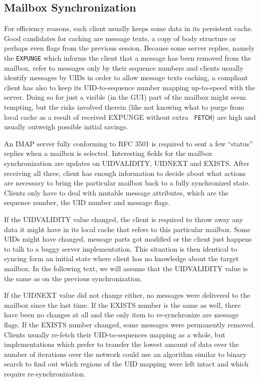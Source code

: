 \documentclass[12pt,notitlepage]{report}
\begin{document}
\subsection{Mailbox Synchronization}

For efficiency reasons, each client usually keeps some data in its persistent
cache.  Good candidates for caching are message texts, a copy of body structure or
perhaps even flags from the previous session.  Because some server replies, namely
the {\tt EXPUNGE} which informs the client that a message has been removed from
the mailbox, refer to messages only by their sequence numbers and clients
usually identify messages by UIDs in order to allow message texts caching, a
compliant client has also to keep its UID-to-sequence number mapping up-to-speed
with the server.  Doing so for just a visible (in the GUI) part of the mailbox
might seem tempting, but the risks involved therein (like not knowing what to
purge from local cache as a result of received EXPUNGE without extra {\tt
FETCH}) are high and usually outweigh possible initial savings.

An IMAP server fully conforming to RFC 3501 is required to sent a few ``status''
replies when a mailbox is selected.  Interesting fields for the mailbox
synchronization are updates on UIDVALIDITY, UIDNEXT and EXISTS.  After receiving
all three, client has enough information to decide about what actions are
necessary to bring the particular mailbox back to a fully synchronized state.
Clients only have to deal with mutable message attributes, which are the
sequence number, the UID number and message flags.

If the UIDVALIDITY value changed, the client is required to throw away any data it
might have in its local cache that refers to this particular mailbox.  Some UIDs
might have changed, message parts got modified or the client just happens to
talk to a buggy server implementation.  This situation is then identical to
syncing form an initial state where client has no knowledge about the target
mailbox. In the following text, we will assume that the UIDVALIDITY value is the
same as on the previous synchronization.

If the UIDNEXT value did not change either, no messages were delivered to the
mailbox since the last time.  If the EXISTS number is the same as well, there
have been no changes at all and the only item to re-synchronize are message
flags.  If the EXISTS number changed, some messages were permanently removed.
Clients usually re-fetch their UID-to-sequences mapping as a whole, but
implementations which prefer to transfer the lowest amount of data over the 
number of iterations over the network could use an algorithm similar
to binary search to find out which regions of the UID mapping were left intact
and which require re-synchronization.
\end{document}
